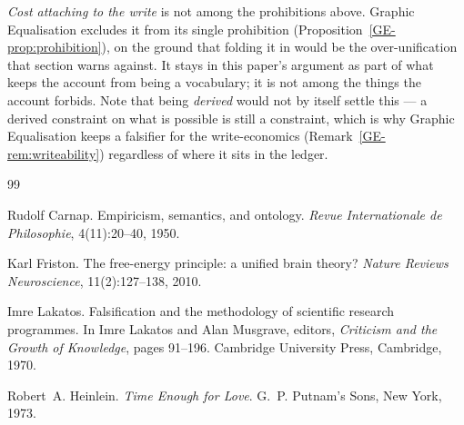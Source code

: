\documentclass[11pt,a4paper]{article}
\begin{document}
\noindent \emph{Cost attaching to the write} is not among the prohibitions above. Graphic
Equalisation excludes it from its single prohibition (Proposition~\ref{GE-prop:prohibition}), on the
ground
that folding it in would be the over-unification that section warns against. It stays in this paper's
argument as part of what keeps the account from being a vocabulary; it is not among the things the
account forbids. Note that being \emph{derived} would not by itself settle this --- a derived
constraint on what is possible is still a constraint, which is why Graphic Equalisation keeps a
falsifier for the write-economics (Remark~\ref{GE-rem:writeability}) regardless of where it sits in
the ledger.

\begin{thebibliography}{99}
\itemsep=2pt

Rudolf Carnap.
\newblock Empiricism, semantics, and ontology.
\newblock \emph{Revue Internationale de Philosophie}, 4(11):20--40, 1950.

Karl Friston.
\newblock The free-energy principle: a unified brain theory?
\newblock \emph{Nature Reviews Neuroscience}, 11(2):127--138, 2010.

Imre Lakatos.
\newblock Falsification and the methodology of scientific research programmes.
\newblock In Imre Lakatos and Alan Musgrave, editors, \emph{Criticism and the Growth of Knowledge}, pages 91--196. Cambridge University Press, Cambridge, 1970.

Robert~A. Heinlein.
\newblock \emph{Time Enough for Love}.
\newblock G.~P. Putnam's Sons, New York, 1973.

\end{thebibliography}
\end{document}
